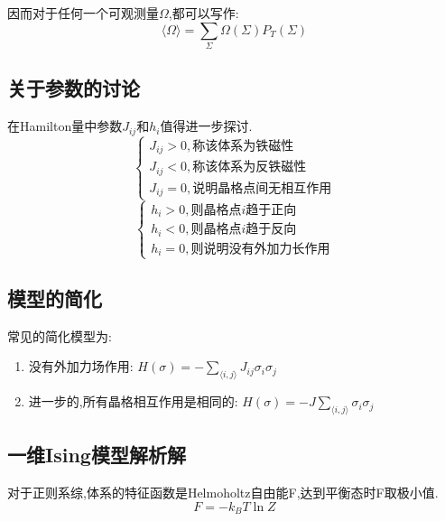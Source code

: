\documentclass[12pt]{article} %
\begin{document}
因而对于任何一个可观测量$\Omega$,都可以写作:
\begin{equation}
\label{equ: Obseration}
\langle \Omega \rangle = \sum_{\Sigma}\Omega(\Sigma)P_{T}(\Sigma)
\end{equation}

\subsection{关于参数的讨论}
在Hamilton量中参数$J_{ij}$和$h_{i}$值得进一步探讨.
$$
\begin{cases}
    J_{ij}>0, 称该体系为铁磁性 \\
    J_{ij}<0, 称该体系为反铁磁性 \\
    J_{ij}=0, 说明晶格点间无相互作用
\end{cases}
$$
$$
\begin{cases}
    h_i>0, 则晶格点i趋于正向 \\
    h_i<0, 则晶格点i趋于反向 \\
    h_i=0, 则说明没有外加力长作用
\end{cases}
$$

\subsection{模型的简化}
常见的简化模型为:
\begin{enumerate}
    \item 没有外加力场作用: $H(\sigma) = -\sum_{\langle i,j \rangle}J_{ij}\sigma_{i}\sigma_{j}$
    \item 进一步的,所有晶格相互作用是相同的: $H(\sigma) = -J\sum_{\langle i,j \rangle}\sigma_{i}\sigma_{j}$
\end{enumerate}

\subsection{一维Ising模型解析解}
对于正则系综,体系的特征函数是Helmoholtz自由能F,达到平衡态时F取极小值.\cite{热统汪志诚}
\begin{equation}
\label{equ: Free_energy}
F = -k_{B}T\ln Z
\end{equation}
\end{document}
